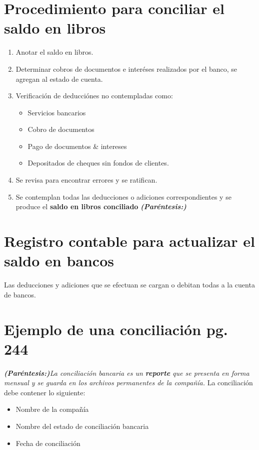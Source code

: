 \documentclass{article}
\begin{document}
\section{Procedimiento para conciliar el saldo en libros}   
\begin{enumerate}
    \item Anotar el saldo en libros.
    \item Determinar cobros de documentos e interéses realizados por el banco, se agregan al estado de cuenta.
    \item Verificación de deducciónes no contempladas como:
    \begin{itemize}
        \item Servicios bancarios 
        \item Cobro de documentos 
        \item Pago de documentos \& intereses 
        \item Depositados de cheques sin fondos de clientes.
    \end{itemize}
    
    \item Se revisa para encontrar errores y se ratifican.
    \item Se contemplan todas las deducciones o adiciones correspondientes y se produce el \textbf{saldo en libros conciliado} \emph{\textbf{(Paréntesis:}\textbf{)}}
\end{enumerate}


\section{Registro contable para actualizar el saldo en bancos}
Las deducciones y adiciones que se efectuan se cargan o debitan todas a la cuenta de bancos.

\section{Ejemplo de una conciliación pg. 244}
\emph{\textbf{(Paréntesis:}\textbf{)}La conciliación bancaria es un \textbf{reporte} que se presenta en forma mensual y se guarda en los archivos permanentes de la compañía.}\newline 
La conciliación debe contener lo siguiente:
\begin{itemize}
    \item Nombre de la compañía 
    \item Nombre del estado de conciliación bancaria
    \item Fecha de conciliación
\end{itemize}
\end{document}
